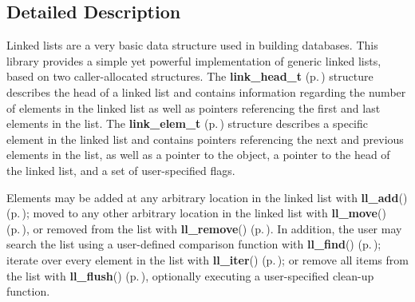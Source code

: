 

\subsection{Detailed Description}
Linked lists are a very basic data structure used in building databases. This library provides a simple yet powerful implementation of generic linked lists, based on two caller-allocated structures. The {\bf link\_\-head\_\-t} {\rm (p.\,\pageref{group__dbprim__link_a0})} structure describes the head of a linked list and contains information regarding the number of elements in the linked list as well as pointers referencing the first and last elements in the list. The {\bf link\_\-elem\_\-t} {\rm (p.\,\pageref{group__dbprim__link_a1})} structure describes a specific element in the linked list and contains pointers referencing the next and previous elements in the list, as well as a pointer to the object, a pointer to the head of the linked list, and a set of user-specified flags.

Elements may be added at any arbitrary location in the linked list with {\bf ll\_\-add}() {\rm (p.\,\pageref{group__dbprim__link_a6})}; moved to any other arbitrary location in the linked list with {\bf ll\_\-move}() {\rm (p.\,\pageref{group__dbprim__link_a7})}, or removed from the list with {\bf ll\_\-remove}() {\rm (p.\,\pageref{group__dbprim__link_a8})}. In addition, the user may search the list using a user-defined comparison function with {\bf ll\_\-find}() {\rm (p.\,\pageref{group__dbprim__link_a9})}; iterate over every element in the list with {\bf ll\_\-iter}() {\rm (p.\,\pageref{group__dbprim__link_a10})}; or remove all items from the list with {\bf ll\_\-flush}() {\rm (p.\,\pageref{group__dbprim__link_a11})}, optionally executing a user-specified clean-up function. 

